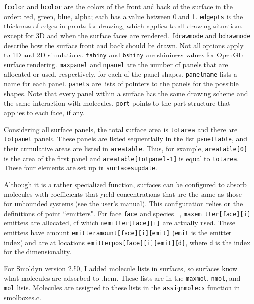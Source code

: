 \documentclass {book}
\begin{document}
\texttt{fcolor} and \texttt{bcolor} are the colors of the front and back of the surface in the order: red, green, blue, alpha; each has a value between 0 and 1.  \texttt{edgepts} is the thickness of edges in points for drawing, which applies to all drawing situations except for 3D and when the surface faces are rendered.  \texttt{fdrawmode} and \texttt{bdrawmode} describe how the surface front and back should be drawn.  Not all options apply to 1D and 2D simulations.  \texttt{fshiny} and \texttt{bshiny} are shininess values for OpenGL surface rendering.  \texttt{maxpanel} and \texttt{npanel} are the number of panels that are allocated or used, respectively, for each of the panel shapes.  \texttt{panelname} lists a name for each panel.  \texttt{panels} are lists of pointers to the panels for the possible shapes.  Note that every panel within a surface has the same drawing scheme and the same interaction with molecules.  \texttt{port} points to the port structure that applies to each face, if any.

Considering all surface panels, the total surface area is \texttt{totarea} and there are \texttt{totpanel} panels.  These panels are listed sequentially in the list \texttt{paneltable}, and their cumulative areas are listed in \texttt{areatable}.  Thus, for example, \texttt{areatable[0]} is the area of the first panel and \texttt{areatable[totpanel-1]} is equal to \texttt{totarea}.  These four elements are set up in \texttt{surfacesupdate}.

Although it is a rather specialized function, surfaces can be configured to absorb molecules with coefficients that yield concentrations that are the same as those for unbounded systems (see the user's manual).  This configuration relies on the definitions of point ``emitters".  For face \texttt{face} and species \texttt{i}, \texttt{maxemitter[face][i]} emitters are allocated, of which \texttt{nemitter[face][i]} are actually used.  These emitters have amount \texttt{emitteramount[face][i][emit]} (\texttt{emit} is the emitter index) and are at locations \texttt{emitterpos[face][i][emit][d]}, where \texttt{d} is the index for the dimensionality.

For Smoldyn version 2.50, I added molecule lists in surfaces, so surfaces know what molecules are adsorbed to them.  These lists are in the \texttt{maxmol}, \texttt{nmol}, and \texttt{mol} lists.  Molecules are assigned to these lists in the \texttt{assignmolecs} function in smolboxes.c.
\end{document}
